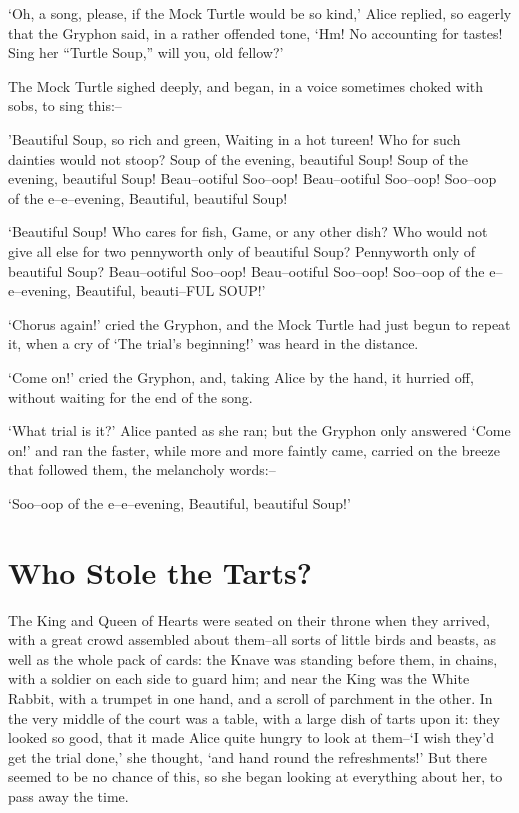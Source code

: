\documentclass[statementpaper,twoside,openany]{memoir}
\begin{document}
`Oh, a song, please, if the Mock Turtle would be so kind,' Alice replied, so eagerly that the Gryphon said, in a rather offended tone, `Hm! No accounting for tastes! Sing her ``Turtle Soup,'' will you, old fellow?'

The Mock Turtle sighed deeply, and began, in a voice sometimes choked with sobs, to sing this:--

'Beautiful Soup, so rich and green, Waiting in a hot tureen! Who for such dainties would not stoop? Soup of the evening, beautiful Soup! Soup of the evening, beautiful Soup! Beau--ootiful Soo--oop! Beau--ootiful Soo--oop! Soo--oop of the e--e--evening, Beautiful, beautiful Soup!

`Beautiful Soup! Who cares for fish, Game, or any other dish? Who would not give all else for two pennyworth only of beautiful Soup? Pennyworth only of beautiful Soup? Beau--ootiful Soo--oop! Beau--ootiful Soo--oop! Soo--oop of the e--e--evening, Beautiful, beauti--FUL SOUP!'

`Chorus again!' cried the Gryphon, and the Mock Turtle had just begun to repeat it, when a cry of `The trial's beginning!' was heard in the distance.

`Come on!' cried the Gryphon, and, taking Alice by the hand, it hurried off, without waiting for the end of the song.

`What trial is it?' Alice panted as she ran; but the Gryphon only answered `Come on!' and ran the faster, while more and more faintly came, carried on the breeze that followed them, the melancholy words:--

`Soo--oop of the e--e--evening, Beautiful, beautiful Soup!'

\chapter{Who Stole the Tarts?}

The King and Queen of Hearts were seated on their throne when they arrived, with a great crowd assembled about them--all sorts of little birds and beasts, as well as the whole pack of cards: the Knave was standing before them, in chains, with a soldier on each side to guard him; and near the King was the White Rabbit, with a trumpet in one hand, and a scroll of parchment in the other. In the very middle of the court was a table, with a large dish of tarts upon it: they looked so good, that it made Alice quite hungry to look at them--`I wish they'd get the trial done,' she thought, `and hand round the refreshments!' But there seemed to be no chance of this, so she began looking at everything about her, to pass away the time.
\end{document}
